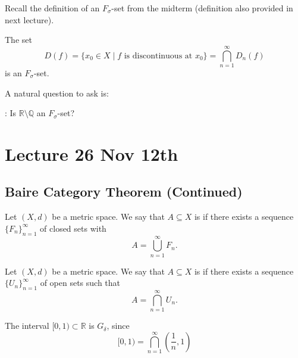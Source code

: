 \documentclass[notoc,notitlepage]{tufte-book}
\begin{document}
\begin{remark}
  Recall the definition of an $F_\sigma$-set from the midterm (definition also provided in next lecture).

  The set
  \begin{equation*}
    D(f) = \{ x_0 \in X \mid f \text{ is discontinuous at } x_0 \} = \bigcap_{n = 1}^{\infty} D_n(f)
  \end{equation*}
  is an $F_\sigma$-set.
\end{remark}

A natural question to ask is:

: Is $\mathbb{R} \setminus \mathbb{Q}$ an $F_\sigma$-set?



\chapter{Lecture 26 Nov 12th}%
\label{chp:lecture_26_nov_12th}

\section{Baire Category Theorem (Continued)}%
\label{sec:baire_category_theorem_continued}

\begin{defn}\label{defn:_f_sigma_sets}
  Let $(X, d)$ be a metric space. We say that $A \subseteq X$ is  if there exists a sequence $\{ F_n \}_{n = 1}^{\infty}$ of closed sets with
  \begin{equation*}
    A = \bigcup_{n=1}^{\infty} F_n.
  \end{equation*}
\end{defn}

\begin{defn}\label{defn:_g_delta_sets}
  Let $(X, d)$ be a metric space. We say that $A \subseteq X$ is  if there exists a sequence $\{ U_n \}_{n = 1}^{\infty}$ of open sets such that
  \begin{equation*}
    A = \bigcap_{n=1}^{\infty} U_n.
  \end{equation*}
\end{defn}

\begin{eg}
  The interval $[0, 1) \subset \mathbb{R}$ is $G_\delta$, since
  \begin{equation*}
    [0, 1) = \bigcap_{n=1}^{\infty} \left( \frac{1}{n}, 1 \right)
  \end{equation*}
\end{eg}
\end{document}
